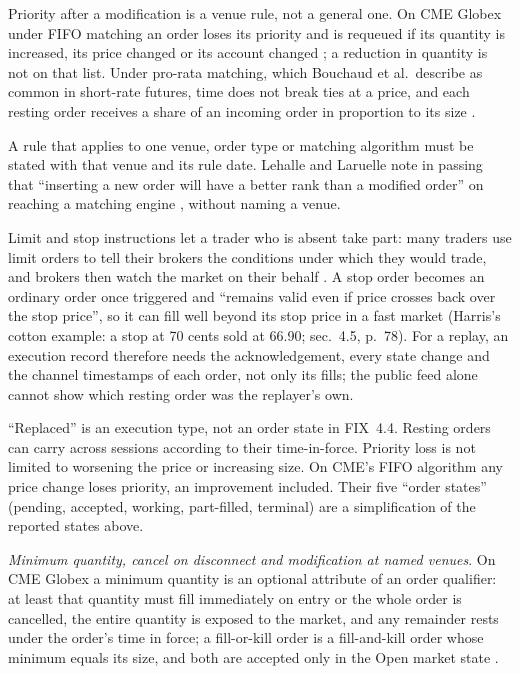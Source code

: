 \begin{qfmechanism}
Priority after a modification is a venue rule, not a general one. On CME Globex under FIFO matching an order loses its priority and is requeued if its quantity is increased, its price changed or its account changed \citep[page ``Supported Matching Algorithms'', updated 11 February 2025]{ex-cme-matching}; a reduction in quantity is not on that list. Under pro-rata matching, which Bouchaud et al.\ describe as common in short-rate futures, time does not break ties at a price, and each resting order receives a share of an incoming order in proportion to its size \citep[chap.~3, sec.~3.2.1, p.~54]{catalogue-0528}.

A rule that applies to one venue, order type or matching algorithm must be stated with that venue and its rule date. Lehalle and Laruelle note in passing that ``inserting a new order will have a better rank than a modified order'' on reaching a matching engine \citep[chap.~1, sec.~1.2.1, p.~70]{alpha-laruelle}, without naming a venue.

 Limit and stop instructions let a trader who is absent take part: many traders use limit orders to tell their brokers the conditions under which they would trade, and brokers then watch the market on their behalf \citep[chap.~4, sec.~4.4.5, pp.~77--78]{alpha-harris}. A stop order becomes an ordinary order once triggered and ``remains valid even if price crosses back over the stop price'', so it can fill well beyond its stop price in a fast market (Harris's cotton example: a stop at 70 cents sold at 66.90; sec.~4.5, p.~78). For a replay, an execution record therefore needs the acknowledgement, every state change and the channel timestamps of each order, not only its fills; the public feed alone cannot show which resting order was the replayer's own.

 ``Replaced'' is an execution type, not an order state in FIX~4.4. Resting orders can carry across sessions according to their time-in-force. Priority loss is not limited to worsening the price or increasing size. On CME's FIFO algorithm any price change loses priority, an improvement included. Their five ``order states'' (pending, accepted, working, part-filled, terminal) are a simplification of the reported states above.

\emph{Minimum quantity, cancel on disconnect and modification at named venues}. On CME Globex a minimum quantity is an optional attribute of an order qualifier: at least that quantity must fill immediately on entry or the whole order is cancelled, the entire quantity is exposed to the market, and any remainder rests under the order's time in force; a fill-or-kill order is a fill-and-kill order whose minimum equals its size, and both are accepted only in the Open market state \citep[page ``Order Qualifiers'', version~3, 11 March 2026]{cme-wiki-2026}.


\end{qfmechanism}
